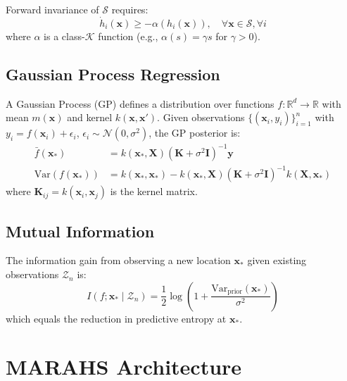 \documentclass[12pt,a4paper,twocolumn]{article}
\newcommand{\cS}{\mathcal{S}}
\newcommand{\cK}{\mathcal{K}}
\newcommand{\cN}{\mathcal{N}}
\newcommand{\cZ}{\mathcal{Z}}
\newcommand{\R}{\mathbb{R}}
\newcommand{\vect}[1]{\mathbf{#1}}
\newcommand{\mat}[1]{\mathbf{#1}}
\begin{document}
Forward invariance of $\cS$ requires:
\begin{equation}
    \dot{h}_i(\vect{x}) \geq -\alpha(h_i(\vect{x})), \quad \forall \vect{x} \in \cS, \forall i
    \label{eq:cbf_condition}
\end{equation}
where $\alpha$ is a class-$\cK$ function (e.g., $\alpha(s) = \gamma s$ for $\gamma > 0$).

\subsection{Gaussian Process Regression}
\label{sec:gp_prelim}

A Gaussian Process (GP) defines a distribution over functions $f : \R^d \to \R$ with mean $m(\vect{x})$ and kernel $k(\vect{x}, \vect{x}')$. Given observations $\{(\vect{x}_i, y_i)\}_{i=1}^n$ with $y_i = f(\vect{x}_i) + \epsilon_i$, $\epsilon_i \sim \cN(0, \sigma^2)$, the GP posterior is:
\begin{align}
    \bar{f}(\vect{x}_*) &= k(\vect{x}_*, \vect{X})(\mat{K} + \sigma^2\mat{I})^{-1}\vect{y} \label{eq:gp_mean} \\
    \text{Var}(f(\vect{x}_*)) &= k(\vect{x}_*, \vect{x}_*) - k(\vect{x}_*, \vect{X})(\mat{K} + \sigma^2\mat{I})^{-1}k(\vect{X}, \vect{x}_*) \label{eq:gp_var}
\end{align}
where $\mat{K}_{ij} = k(\vect{x}_i, \vect{x}_j)$ is the kernel matrix.

\subsection{Mutual Information}
\label{sec:mi_prelim}

The information gain from observing a new location $\vect{x}_*$ given existing observations $\cZ_n$ is:
\begin{equation}
    I(f; \vect{x}_* \mid \cZ_n) = \frac{1}{2}\log\left(1 + \frac{\text{Var}_{\text{prior}}(\vect{x}_*)}{\sigma^2}\right)
    \label{eq:info_gain}
\end{equation}
which equals the reduction in predictive entropy at $\vect{x}_*$.


\section{MARAHS Architecture}
\label{sec:methodology}
\end{document}
